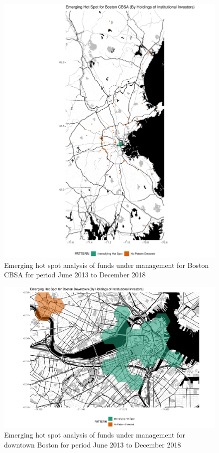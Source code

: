 \begin{figure}
	\centering
	\includegraphics[width=1\linewidth]{Figures/ChapterIV/Bos_Money_EH}
	\caption[Emerging Hot Spot Analysis of Funds Under Management for Boston CBSA 2013-2018]{Emerging hot spot analysis of funds under management for Boston CBSA for period June 2013 to December 2018}
	\label{fig:bostonmoneyhotspot}
\end{figure}

\begin{figure}
	\centering
	\includegraphics[width=1\linewidth]{Figures/ChapterIV/Bos_Money_EH_Downtown}
	\caption[Emerging Hot Spot Analysis of Funds Under Management for Downtown Boston 2013-2018]{Emerging hot spot analysis of funds under management for downtown Boston for period June 2013 to December 2018}
	\label{fig:bostonmoneyhotspot_Downtown}
\end{figure}


